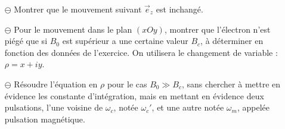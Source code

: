 \documentclass{report}
\begin{document}
\begin{itemize}

		\item[$\ominus$] Montrer que le mouvement suivant $\vec{e}_z$ est inchangé.
		
		\item[$\ominus$] Pour le mouvement dans le plan $(xOy)$, montrer que l'électron n'est piégé que si $B_0$ est supérieur a une certaine valeur $B_c$, à déterminer en fonction des données de l'exercice. On utilisera le changement de variable : $\rho = x+iy$.
		
		\item[$\ominus$] Résoudre l'équation en $\rho$ pour le cas $B_0\gg B_c$, sans chercher à mettre en évidence les constante d'intégration, mais en mettant en évidence deux pulsations, l'une voisine de $\omega_c$, notée $\omega_c'$, et une autre notée $\omega_m$, appelée pulsation magnétique. 
		
\end{itemize}
\end{document}
